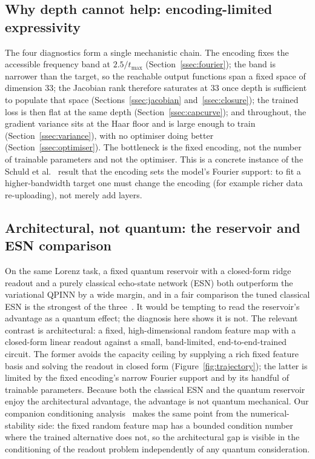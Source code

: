 \documentclass[a4paper,12pt]{iopart}
\begin{document}
\subsection{Why depth cannot help: encoding-limited expressivity}

The four diagnostics form a single mechanistic chain. The encoding fixes the
accessible frequency band at $2.5/t_{\max}$
(Section~\ref{ssec:fourier}); the band is narrower than the target, so the
reachable output functions span a fixed space of dimension $33$; the Jacobian
rank therefore saturates at $33$ once depth is sufficient to populate that space
(Sections~\ref{ssec:jacobian} and~\ref{ssec:closure}); the trained loss is then
flat at the same depth (Section~\ref{ssec:capcurve}); and throughout, the
gradient variance sits at the Haar floor and is large enough to train
(Section~\ref{ssec:variance}), with no optimiser doing better
(Section~\ref{ssec:optimiser}). The bottleneck is the fixed encoding, not the
number of trainable parameters and not the optimiser. This is a concrete
instance of the Schuld et al.~\cite{schuld2021effect} result that the encoding
sets the model's Fourier support: to fit a higher-bandwidth target one must
change the encoding (for example richer data re-uploading), not merely add
layers.

\subsection{Architectural, not quantum: the reservoir and ESN comparison}
\label{ssec:architectural}

On the same Lorenz task, a fixed quantum reservoir with a closed-form ridge
readout and a purely classical echo-state network (ESN) both outperform the
variational QPINN by a wide margin, and in a fair comparison the tuned classical
ESN is the strongest of the three~\cite{pandey2604,pandey2607b}. It
would be tempting to read the reservoir's advantage as a quantum effect; the
diagnosis here shows it is not. The relevant contrast is architectural: a fixed,
high-dimensional random feature map with a closed-form linear readout against a
small, band-limited, end-to-end-trained circuit. The former avoids the capacity
ceiling by supplying a rich fixed feature basis and solving the readout in closed
form (Figure~\ref{fig:trajectory}); the latter is limited by the fixed encoding's
narrow Fourier support and by
its handful of trainable parameters. Because both the classical ESN and the
quantum reservoir enjoy the architectural advantage, the advantage is not quantum
mechanical. Our companion conditioning
analysis~\cite{pandey2607} makes the same point from the
numerical-stability side: the fixed random feature map has a bounded condition
number where the trained alternative does not, so the architectural gap is
visible in the conditioning of the readout problem independently of any quantum
consideration.
\end{document}
